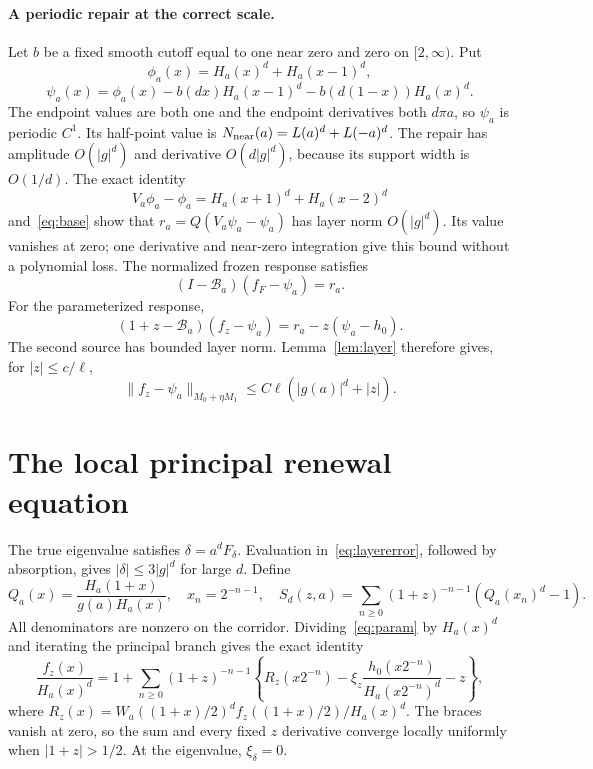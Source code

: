 \documentclass[11pt,a4paper]{article}
\begin{document}
\paragraph{A periodic repair at the correct scale.}
Let $b$ be a fixed smooth cutoff equal to one near zero and zero on $[2,\infty)$. Put
\[
 \phi_a(x)=H_a(x)^d+H_a(x-1)^d,
\]
\[
 \psi_a(x)=\phi_a(x)-b(dx)H_a(x-1)^d-b(d(1-x))H_a(x)^d.
\]
The endpoint values are both one and the endpoint derivatives both $d\pi a$, so $\psi_a$ is periodic $C^1$. Its half-point value is $N_{\rm near}(a)=L(a)^d+L(-a)^d$. The repair has amplitude $O(|g|^d)$ and derivative $O(d|g|^d)$, because its support width is $O(1/d)$.
The exact identity
\[
 V_a\phi_a-\phi_a=H_a(x+1)^d+H_a(x-2)^d
\]
and~\eqref{eq:base} show that $r_a=Q(V_a\psi_a-\psi_a)$ has layer norm $O(|g|^d)$. Its value vanishes at zero; one derivative and near-zero integration give this bound without a polynomial loss. The normalized frozen response satisfies
\[
 (I-\mathcal B_a)(f_F-\psi_a)=r_a.
\]
For the parameterized response,
\[
 (1+z-\mathcal B_a)(f_z-\psi_a)=r_a-z(\psi_a-h_0).
\]
The second source has bounded layer norm. Lemma~\ref{lem:layer} therefore gives, for $|z|\le c/\ell$,
\begin{equation}\label{eq:layererror}
 \|f_z-\psi_a\|_{M_0+\eta M_1}
 \le C\ell(|g(a)|^d+|z|).
\end{equation}

\section{The local principal renewal equation}
The true eigenvalue satisfies $\delta=a^dF_\delta$. Evaluation in~\eqref{eq:layererror}, followed by absorption, gives $|\delta|\le3|g|^d$ for large $d$. Define
\[
 Q_a(x)=\frac{H_a(1+x)}{g(a)H_a(x)},\quad x_n=2^{-n-1},\quad
 S_d(z,a)=\sum_{n\ge0}(1+z)^{-n-1}(Q_a(x_n)^d-1).
\]
All denominators are nonzero on the corridor. Dividing~\eqref{eq:param} by $H_a(x)^d$ and iterating the principal branch gives the exact identity
\begin{equation}\label{eq:renewalexact}
 \frac{f_z(x)}{H_a(x)^d}=1+\sum_{n\ge0}(1+z)^{-n-1}
 \left\{R_z(x2^{-n})-\xi_z\frac{h_0(x2^{-n})}{H_a(x2^{-n})^d}-z\right\},
\end{equation}
where $R_z(x)=W_a((1+x)/2)^df_z((1+x)/2)/H_a(x)^d$. The braces vanish at zero, so the sum and every fixed $z$ derivative converge locally uniformly when $|1+z|>1/2$. At the eigenvalue, $\xi_\delta=0$.
\end{document}
